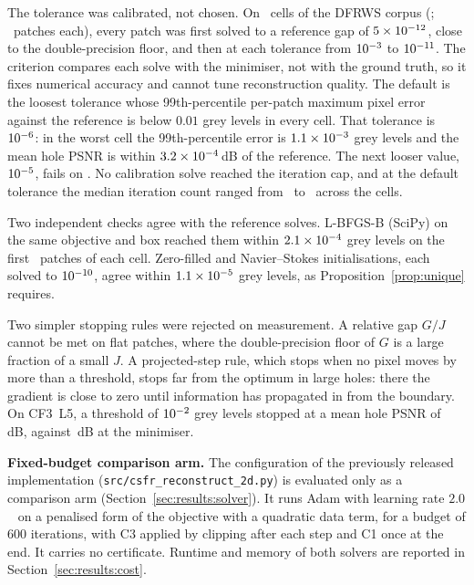 \documentclass[final,3p]{elsarticle}
\begin{document}
The tolerance was calibrated, not chosen. On \calibNcells\ cells of the DFRWS corpus (\calibCells; \calibNpatches\ patches each), every patch was first solved to a reference gap of $5\times 10^{-12}$, close to the double-precision floor, and then at each tolerance from $10^{-3}$ to $10^{-11}$. The criterion compares each solve with the minimiser, not with the ground truth, so it fixes numerical accuracy and cannot tune reconstruction quality. The default is the loosest tolerance whose 99th-percentile per-patch maximum pixel error against the reference is below $0.01$ grey levels in every cell. That tolerance is $10^{-6}$: in the worst cell the 99th-percentile error is $1.1\times 10^{-3}$ grey levels and the mean hole PSNR is within $3.2\times 10^{-4}$\,dB of the reference. The next looser value, $10^{-5}$, fails on \calibNextFailCells. No calibration solve reached the iteration cap, and at the default tolerance the median iteration count ranged from \calibItersMin\ to \calibItersMax\ across the cells.

Two independent checks agree with the reference solves. L-BFGS-B (SciPy) on the same objective and box reached them within $2.1\times 10^{-4}$ grey levels on the first \calibLbfgsbN\ patches of each cell. Zero-filled and Navier--Stokes initialisations, each solved to $10^{-10}$, agree within $1.1\times 10^{-5}$ grey levels, as Proposition~\ref{prop:unique} requires.

Two simpler stopping rules were rejected on measurement. A relative gap $G/J$ cannot be met on flat patches, where the double-precision floor of $G$ is a large fraction of a small $J$. A projected-step rule, which stops when no pixel moves by more than a threshold, stops far from the optimum in large holes: there the gradient is close to zero until information has propagated in from the boundary. On CF3~L5, a threshold of $10^{-2}$ grey levels stopped at a mean hole PSNR of \calibRejStepPsnr\,dB, against \calibRejRefPsnr\,dB at the minimiser.

\textbf{Fixed-budget comparison arm.} The configuration of the previously released implementation (\texttt{src/\allowbreak csfr\allowbreak\_reconstruct\allowbreak\_2d.py}) is evaluated only as a comparison arm (Section~\ref{sec:results:solver}). It runs Adam with learning rate $2.0$~\cite{kingma2015adam} on a penalised form of the objective with a quadratic data term, for a budget of $600$ iterations, with C3 applied by clipping after each step and C1 once at the end. It carries no certificate. Runtime and memory of both solvers are reported in Section~\ref{sec:results:cost}.
\end{document}
